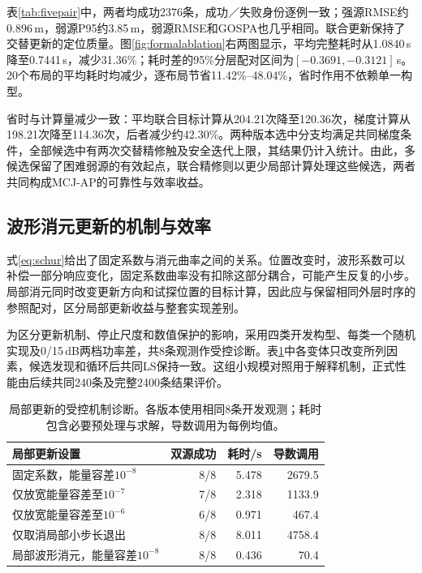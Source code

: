 \documentclass[a4paper,fleqn]{cas-sc}
\numberwithin{equation}{section}
\numberwithin{figure}{section}
\numberwithin{table}{section}
\begin{document}

表\ref{tab:fivepair}中，两者均成功2376条，成功／失败身份逐例一致；强源RMSE约0.896\,m，弱源P95约3.85\,m，弱源RMSE和GOSPA也几乎相同。联合更新保持了交替更新的定位质量。图\ref{fig:formalablation}右两图显示，平均完整耗时从1.0840\,s降至0.7441\,s，减少31.36\%；耗时差的95\%分层配对区间为$[-0.3691,-0.3121]$\,s。20个布局的平均耗时均减少，逐布局节省11.42\%--48.04\%，省时作用不依赖单一构型。

省时与计算量减少一致：平均联合目标计算从204.21次降至120.36次，梯度计算从198.21次降至114.36次，后者减少约42.30\%。两种版本选中分支均满足共同梯度条件，全部候选中有两次交替精修触及安全迭代上限，其结果仍计入统计。由此，多候选保留了困难弱源的有效起点，联合精修则以更少局部计算处理这些候选，两者共同构成MCJ-AP的可靠性与效率收益。

\FloatBarrier
\subsection{波形消元更新的机制与效率}\label{sec:mechanismresults}
式\eqref{eq:schur}给出了固定系数与消元曲率之间的关系。位置改变时，波形系数可以补偿一部分响应变化，固定系数曲率没有扣除这部分耦合，可能产生反复的小步。局部消元同时改变更新方向和试探位置的目标计算，因此应与保留相同外层时序的参照配对，区分局部更新收益与整套实现差别。

为区分更新机制、停止尺度和数值保护的影响，采用四类开发构型、每类一个随机实现及0/15\,dB两档功率差，共8条观测作受控诊断。表\ref{tab:mechanism}中各变体只改变所列因素，候选发现和循环后共同LS保持一致。这组小规模对照用于解释机制，正式性能由后续共同240条及完整2400条结果评价。

\begin{table}[pos=H]\centering\small
\caption{局部更新的受控机制诊断。各版本使用相同8条开发观测；耗时包含必要预处理与求解，导数调用为每例均值。}\label{tab:mechanism}
\begin{tabular}{@{}lrrr@{}}\toprule
局部更新设置 & 双源成功 & 耗时/s & 导数调用\\\midrule
固定系数，能量容差$10^{-8}$ & 8/8 & 5.478 & 2679.5\\
仅放宽能量容差至$10^{-7}$ & 7/8 & 2.318 & 1133.9\\
仅放宽能量容差至$10^{-6}$ & 6/8 & 0.971 & 467.4\\
仅取消局部小步长退出 & 8/8 & 8.011 & 4758.4\\
局部波形消元，能量容差$10^{-8}$ & 8/8 & 0.436 & 70.4\\\bottomrule
\end{tabular}\end{table}
\end{document}

